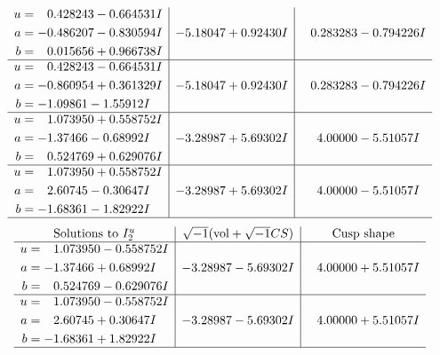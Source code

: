 \documentclass[1p]{elsarticle_modified}
\theoremstyle{definition}
\newcommand{\I}{\sqrt{-1}}
\begin{document}
$$\begin{array}{c|c|c}
\begin{aligned}
u &= \phantom{-}0.428243 - 0.664531 I \\
a &= -0.486207 - 0.830594 I \\
b &= \phantom{-}0.015656 + 0.966738 I\end{aligned}
 & -5.18047 + 0.92430 I & \phantom{-}0.283283 - 0.794226 I \\ \hline\begin{aligned}
u &= \phantom{-}0.428243 - 0.664531 I \\
a &= -0.860954 + 0.361329 I \\
b &= -1.09861 - 1.55912 I\end{aligned}
 & -5.18047 + 0.92430 I & \phantom{-}0.283283 - 0.794226 I \\ \hline\begin{aligned}
u &= \phantom{-}1.073950 + 0.558752 I \\
a &= -1.37466 - 0.68992 I \\
b &= \phantom{-}0.524769 + 0.629076 I\end{aligned}
 & -3.28987 + 5.69302 I & \phantom{-}4.00000 - 5.51057 I \\ \hline\begin{aligned}
u &= \phantom{-}1.073950 + 0.558752 I \\
a &= \phantom{-}2.60745 - 0.30647 I \\
b &= -1.68361 - 1.82922 I\end{aligned}
 & -3.28987 + 5.69302 I & \phantom{-}4.00000 - 5.51057 I\\
 \hline 
 \end{array}$$\newpage$$\begin{array}{c|c|c}  
\text{Solutions to }I^u_{2}& \I (\text{vol} + \sqrt{-1}CS) & \text{Cusp shape}\\
 \hline 
\begin{aligned}
u &= \phantom{-}1.073950 - 0.558752 I \\
a &= -1.37466 + 0.68992 I \\
b &= \phantom{-}0.524769 - 0.629076 I\end{aligned}
 & -3.28987 - 5.69302 I & \phantom{-}4.00000 + 5.51057 I \\ \hline\begin{aligned}
u &= \phantom{-}1.073950 - 0.558752 I \\
a &= \phantom{-}2.60745 + 0.30647 I \\
b &= -1.68361 + 1.82922 I\end{aligned}
 & -3.28987 - 5.69302 I & \phantom{-}4.00000 + 5.51057 I\\
 \hline 
 \end{array}$$\newpage\newpage\renewcommand{\arraystretch}{1}
\end{document}
